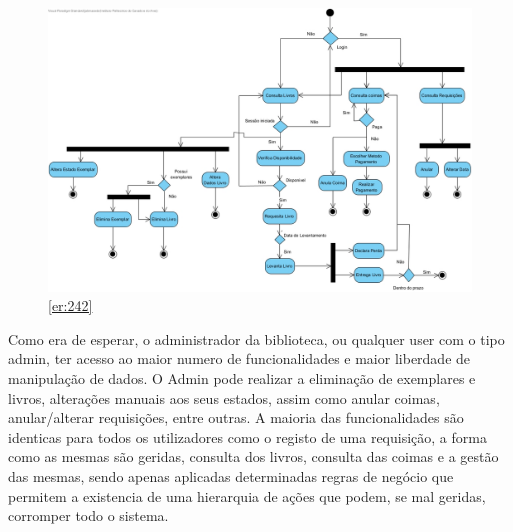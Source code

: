 \subsection{}

\begin{figure}[H]
	\centering
	\includegraphics[width=1\linewidth]{./img/Diagramas_A/DA_Admin.jpg}  %
	\caption{\ref{er:242}}
	\label{fig:chap242}
\end{figure}

Como era de esperar, o administrador da biblioteca, ou qualquer user com o tipo admin, ter acesso ao maior numero de funcionalidades e maior liberdade de manipulação de dados.
O Admin pode realizar a eliminação de exemplares e livros, alterações manuais aos seus estados, assim como anular coimas, anular/alterar requisições, entre outras.
A maioria das funcionalidades são identicas para todos os utilizadores como o registo de uma requisição, a forma como as mesmas são geridas, consulta dos livros, consulta das coimas e a gestão das mesmas, sendo apenas aplicadas determinadas regras de negócio que permitem a existencia de uma hierarquia de ações que podem, se mal geridas, corromper todo o sistema.